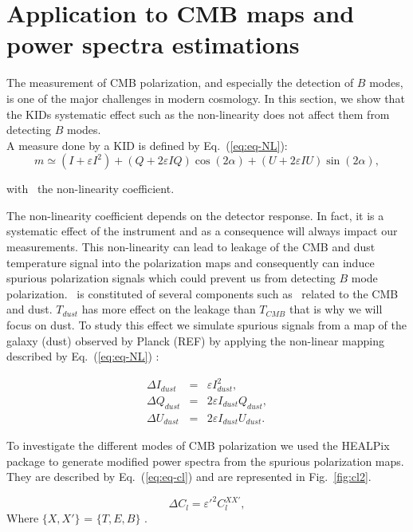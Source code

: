 \section{Application to CMB maps and power spectra estimations}
\label{sec:cmb}
The measurement of CMB polarization, and especially the detection of $B$ modes, is one of the major challenges in modern cosmology. In this section, we show that the KIDs systematic effect such as the non-linearity does not affect them from detecting $B$ modes.\\

A measure done by a KID is defined by Eq.~(\ref{eq:eq-NL}):
\begin{equation}
m  \simeq (I + \varepsilon I^{2}) + (Q + 2\varepsilon IQ) \cos(2\alpha) + (U + 2 \varepsilon IU) \sin(2\alpha),
\label{eq:eq-NL}
\end{equation}

with \eps\ the non-linearity coefficient.

The non-linearity coefficient depends on the detector response. In fact, it is a systematic effect of the instrument and as a consequence will always impact our measurements. This non-linearity can lead to leakage of the CMB and dust temperature signal into the polarization maps and consequently can induce spurious polarization signals which could prevent us from detecting $B$ mode polarization. \eps\ is constituted of several components such as \eps\ related to the CMB and dust. $T_{dust}$ has more effect on the leakage than $T_{CMB}$  that is why we will focus on dust.
To study this effect we simulate spurious signals from a map of the galaxy (dust) observed by Planck (REF) by applying the non-linear mapping described by Eq.~(\ref{eq:eq-NL}) :

\begin{eqnarray}
\label{eq:spurious-mapI}
\Delta I_{dust}  &=& \varepsilon I_{dust}^{2},\\
\label{eq:spurious-mapQ}
\Delta Q_{dust}  &=& 2\varepsilon I_{dust}Q_{dust},\\
\label{eq:spurious-mapU}
\Delta U_{dust} &=& 2 \varepsilon I_{dust}U_{dust}.
\end{eqnarray}

To investigate the different modes of CMB polarization we used the HEALPix package \citep{2005ApJ...622..759G} to generate modified power spectra from the spurious polarization maps. They are described by Eq.~(\ref{eq:eq-cl}) and are represented in Fig.~\ref{fig:cl2}.

\begin{equation}
\Delta C_{l} = \varepsilon'^{2} C_{l}^{XX'},
\label{eq:eq-cl}
\end{equation}
Where $\lbrace X,X' \rbrace$ = $\lbrace T,E,B \rbrace$ .\\

